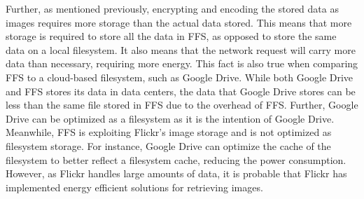 Further, as mentioned previously, encrypting and encoding the stored data as images requires more storage than the actual data stored. This means that more storage is required to store all the data in FFS, as opposed to store the same data on a local filesystem. It also means that the network request will carry more data than necessary, requiring more energy. This fact is also true when comparing FFS to a cloud-based filesystem, such as Google Drive. While both Google Drive and FFS stores its data in data centers, the data that Google Drive stores can be less than the same file stored in FFS due to the overhead of FFS. Further, Google Drive can be optimized as a filesystem as it is the intention of Google Drive. Meanwhile, FFS is exploiting Flickr's image storage and is not optimized as filesystem storage. For instance, Google Drive can optimize the cache of the filesystem to better reflect a filesystem cache, reducing the power consumption. However, as Flickr handles large amounts of data, it is probable that Flickr has implemented energy efficient solutions for retrieving images. 


